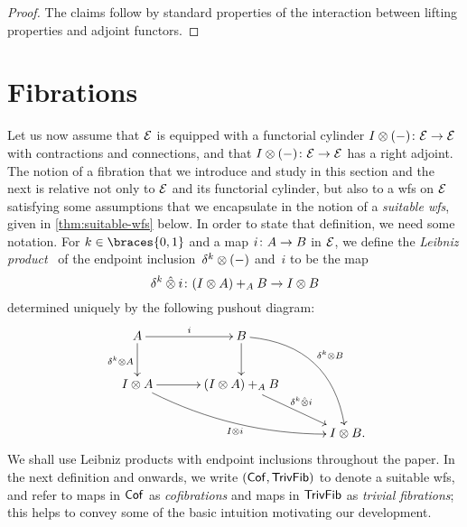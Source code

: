 \documentclass[reqno,10pt,a4paper,oneside,draft]{amsart}
\begin{document}
\begin{proof} The claims follow by standard properties of the interaction between lifting properties and adjoint functors.
\end{proof}

\section{Fibrations}
\label{sec:fib}

Let us now assume  that $\catE$ is equipped with a functorial cylinder $\interval\otimes (-) \co \catE \to \catE$ with contractions and connections, and that $\interval\otimes (-) \co \catE \to \catE$ has a right adjoint.
The notion of a fibration that we introduce and study in this section and the next is relative not only to $\cal{E}$ and its functorial cylinder, but also to a wfs on $\cal{E}$ satisfying some assumptions that we encapsulate in the notion of a \emph{suitable wfs}, given in \cref{thm:suitable-wfs} below.
In order to state that definition, we need some notation.
For $k \in \braces{0, 1}$ and a map $i \co A \to B$ in $\catE$, we define the \emph{Leibniz product}~\cite{riehl-verity:reedy} of the endpoint inclusion~$\kcyl \otimes (-)$ and~$i$ to be the map
\[
\kcyl \hatotimes i \co (\interval \otimes A) +_A B \to \interval \otimes B
\]
determined uniquely by the following pushout diagram:
\begin{gather*}
\xymatrix@C=1.2cm{
  A
  \ar[r]^{i}
  \ar[d]_{\kcyl \otimes A}
&
  B
  \ar@/^2pc/[ddr]^{\kcyl \otimes B}
  \ar[d]
&\\
  \interval \otimes A
  \ar@/_1pc/[drr]_{\interval \otimes i}
  \ar[r]
&
  (\interval \otimes A) +_A B
  \ar[dr]^-{\delta^k \hatotimes i}
&\\&&
  \interval \otimes B
\rlap{.}}
\end{gather*}
We shall use Leibniz products with endpoint inclusions throughout the paper.
In the next definition and onwards, we write $(\Cof, \TrivFib)$ to denote a suitable wfs, and refer to maps in $\Cof$ as \emph{cofibrations} and maps in $\TrivFib$ as \emph{trivial fibrations}; this helps to convey some of the basic intuition motivating our development.
\end{document}
